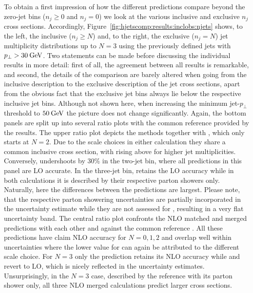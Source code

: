 To obtain a first impression of how the different predictions 
compare beyond the zero-jet bins ($n_j\ge0$ and $n_j=0$) we 
look at the various inclusive and exclusive $n_j$ cross sections.
Accordingly, Figure~\ref{fig:hjetscomp:results:inclobs:njets} shows,
to the left, the inclusive ($n_j\ge N$) and, to the right, the
exclusive ($n_j=N$) jet multiplicity distributions up to $N=3$ 
using the previously defined \antikt jets with $p_\perp>30\text{\:GeV}$. Two
statements can be made before discussing the individual results in
more detail: first of all, the agreement between all results is
remarkable, and second, the details of the comparison are barely
altered when going from the inclusive description to the exclusive
description of the jet cross sections, apart from the obvious fact
that the exclusive jet bins always lie below the respective inclusive
jet bins. Although not shown here, when increasing the minimum jet-$p_\perp$ 
threshold to $50\text{\:GeV}$ the picture does not change significantly. 
Again, the bottom panels are split up into several ratio
plots with the common reference provided by the \Powheg \NNLOPS
results. The upper ratio plot depicts the \NNLOPS methods together
with \Hej, which only starts at $N=2$. Due to the scale choices in either 
\NNLOPS calculation they share a common inclusive cross section, with 
\Sherpa rising above \Powheg for higher jet multiplicities. Conversely,
\Hej undershoots by 30\% in the two-jet bin, where all predictions in this 
panel are LO accurate. In the three-jet bin, \Hej retains the LO accuracy 
while in both \NNLOPS calculations it is described by their respective 
parton showers only. Naturally, here the differences between the \NNLOPS 
predictions are largest. Please note, that the respective parton showering 
uncertainties are partially incorporated in the \Sherpa \NNLOPS uncertainty 
estimate while they are not assessed for \Powheg, resulting in a very flat 
uncertainty band. The central ratio plot confronts the NLO
matched and merged predictions with each other and against the common reference 
\Powheg \NNLOPS. All these predictions have claim NLO accuracy for $N=0,1,2$ 
and overlap well within uncertainties where the lower value for \MGaMC can 
again be attributed to the different scale choice. For $N=3$ only the \Sherpa 
\MEPSatNLO prediction retains its NLO accuracy while \MGaMC and \Herwig 
revert to LO, which is nicely reflected in the uncertainty estimates. 
Unsurprisingly, in the $N=3$ case, described by the reference with its 
parton shower only, all three NLO merged calculations predict larger 
cross sections.

